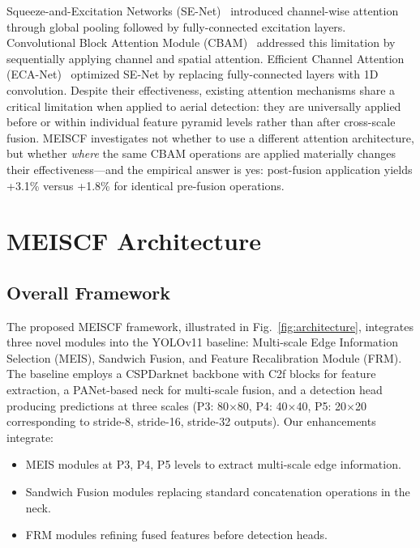 \documentclass[preprint,12pt]{elsarticle}
\begin{document}
Squeeze-and-Excitation Networks (SE-Net)~\cite{senet} introduced channel-wise
attention through global pooling followed by fully-connected excitation layers.
Convolutional Block Attention Module (CBAM)~\cite{cbam} addressed this limitation
by sequentially applying channel and spatial attention. Efficient Channel
Attention (ECA-Net)~\cite{ecanet} optimized SE-Net by replacing fully-connected
layers with 1D convolution. Despite their effectiveness, existing attention
mechanisms share a critical limitation when applied to aerial detection: they are
universally applied before or within individual feature pyramid levels rather than
after cross-scale fusion. MEISCF investigates not whether to use a different
attention architecture, but whether \emph{where} the same CBAM operations are
applied materially changes their effectiveness---and the empirical answer is yes:
post-fusion application yields +3.1\% versus +1.8\% for identical pre-fusion
operations.



\section{MEISCF Architecture}
\label{sec:arch}

\subsection{Overall Framework}

The proposed MEISCF framework, illustrated in Fig.~\ref{fig:architecture},
integrates three novel modules into the YOLOv11 baseline: Multi-scale Edge
Information Selection (MEIS), Sandwich Fusion, and Feature Recalibration Module
(FRM). The baseline employs a CSPDarknet backbone with C2f blocks for feature
extraction, a PANet-based neck for multi-scale fusion, and a detection head
producing predictions at three scales (P3: 80$\times$80, P4: 40$\times$40, P5:
20$\times$20 corresponding to stride-8, stride-16, stride-32 outputs). Our
enhancements integrate:

\begin{itemize}
\item MEIS modules at P3, P4, P5 levels to extract multi-scale edge information.
\item Sandwich Fusion modules replacing standard concatenation operations in the
      neck.
\item FRM modules refining fused features before detection heads.
\end{itemize}
\end{document}
